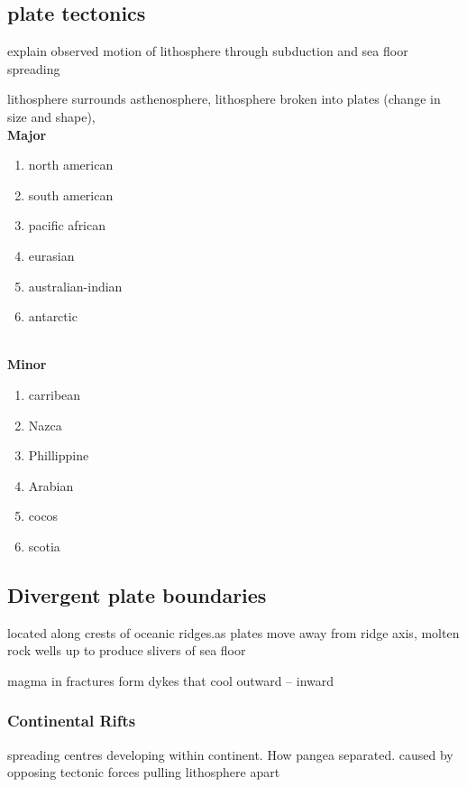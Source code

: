 \documentclass[11pt]{amsart}
\begin{document}
  \subsection{plate tectonics}
  \par explain observed motion of lithosphere through subduction and sea floor
  spreading
  \par lithosphere surrounds asthenosphere, lithosphere broken into plates
  (change in size and shape),
  \\
  \textbf{Major}
  \begin{enumerate}
    \item north american
    \item south american
    \item pacific african
    \item eurasian
    \item australian-indian
    \item antarctic
  \end{enumerate}
  \\
  \textbf{Minor}
  \begin{enumerate}
    \item carribean
    \item Nazca
    \item Phillippine
    \item Arabian
    \item cocos
    \item scotia
  \end{enumerate}

  \subsection{Divergent plate boundaries}
  \par located along crests of oceanic ridges.as plates move away from
  ridge axis, molten rock wells up to produce slivers of sea floor
  \par magma in fractures form dykes that cool outward -- inward
  \subsubsection{Continental Rifts}
  \par spreading centres developing within continent. How pangea
  separated. caused by opposing tectonic forces pulling lithosphere apart
\end{document}
